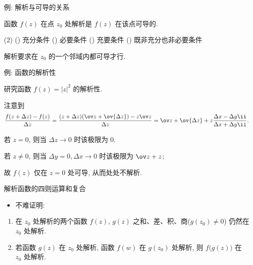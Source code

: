 \begin{frame}{例: 解析与可导的关系}
	\onslide<+->
	\begin{exercise}[nearnext]
		函数 $f(z)$ 在点 $z_0$ 处解析是 $f(z)$ 在该点可导的.
		\begin{exchoice}(2)
			() 充分条件
			() 必要条件
			() 充要条件
			() 既非充分也非必要条件
		\end{exchoice}
	\end{exercise}
	\onslide<+->
	\begin{answer}[nearprev]
		解析要求在 $z_0$ 的一个邻域内都可导才行.
	\end{answer}
\end{frame}


\begin{frame}{例: 函数的解析性}
	\onslide<+->
	\begin{example}[nearnext]
		研究函数 $f(z)=|z|^2$ 的解析性.
	\end{example}

	\onslide<+->
	\begin{solution}[nearprev]
		\begin{itemize*}
			\item 注意到
			\[
				\frac{f(z+\Delta z)-f(z)}{\Delta z}
				=\frac{(z+\Delta z)(\ov z+\ov{\Delta z})-z\ov z}{\Delta z}
				=\ov z+\ov{\Delta z}+z\frac{\Delta x-\Delta y\ii}{\Delta x+\Delta y\ii}.
			\]
			\item 若 $z=0$, 则当 $\Delta z\to 0$ 时该极限为 $0$.
			\item 若 $z\neq0$, 则当 $\Delta y=0,\Delta x\to 0$ 时该极限为 $\ov z+z$;
			\onslide<+->{%
			因此此时极限不存在.
			}
			\item 故 $f(z)$ 仅在 $z=0$ 处可导, 从而处处不解析.
		\end{itemize*}
	\end{solution}
\end{frame}


\begin{frame}{解析函数的四则运算和复合}
	\begin{itemize}
		\item 不难证明:
	\end{itemize}
	\onslide<+->
	\begin{theorem}
		\begin{enumerate}
			\item 在 $z_0$ 处解析的两个函数 $f(z)$, $g(z)$ 之和、差、积、商($g(z_0)\neq 0$) 仍然在 $z_0$ 处解析.
			\item 若函数 $g(z)$ 在 $z_0$ 处解析, 函数 $f(w)$ 在 $g(z_0)$ 处解析, 则 $f\bigl(g(z)\bigr)$ 在 $z_0$ 处解析.
		\end{enumerate}
	\end{theorem}
\end{frame}


